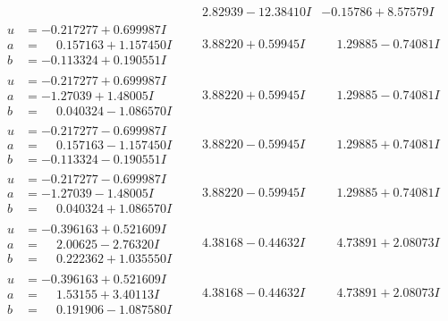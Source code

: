 \documentclass[1p]{elsarticle_modified}
\theoremstyle{definition}
\begin{document}
$$\begin{array}{c|c|c}
 & \phantom{-}2.82939 - 12.38410 I & -0.15786 + 8.57579 I \\ \hline\begin{aligned}
u &= -0.217277 + 0.699987 I \\
a &= \phantom{-}0.157163 + 1.157450 I \\
b &= -0.113324 + 0.190551 I\end{aligned}
 & \phantom{-}3.88220 + 0.59945 I & \phantom{-}1.29885 - 0.74081 I \\ \hline\begin{aligned}
u &= -0.217277 + 0.699987 I \\
a &= -1.27039 + 1.48005 I \\
b &= \phantom{-}0.040324 - 1.086570 I\end{aligned}
 & \phantom{-}3.88220 + 0.59945 I & \phantom{-}1.29885 - 0.74081 I \\ \hline\begin{aligned}
u &= -0.217277 - 0.699987 I \\
a &= \phantom{-}0.157163 - 1.157450 I \\
b &= -0.113324 - 0.190551 I\end{aligned}
 & \phantom{-}3.88220 - 0.59945 I & \phantom{-}1.29885 + 0.74081 I \\ \hline\begin{aligned}
u &= -0.217277 - 0.699987 I \\
a &= -1.27039 - 1.48005 I \\
b &= \phantom{-}0.040324 + 1.086570 I\end{aligned}
 & \phantom{-}3.88220 - 0.59945 I & \phantom{-}1.29885 + 0.74081 I \\ \hline\begin{aligned}
u &= -0.396163 + 0.521609 I \\
a &= \phantom{-}2.00625 - 2.76320 I \\
b &= \phantom{-}0.222362 + 1.035550 I\end{aligned}
 & \phantom{-}4.38168 - 0.44632 I & \phantom{-}4.73891 + 2.08073 I \\ \hline\begin{aligned}
u &= -0.396163 + 0.521609 I \\
a &= \phantom{-}1.53155 + 3.40113 I \\
b &= \phantom{-}0.191906 - 1.087580 I\end{aligned}
 & \phantom{-}4.38168 - 0.44632 I & \phantom{-}4.73891 + 2.08073 I \\ \hline\begin{aligned}

\end{aligned}
\end{array}$$
\end{document}
